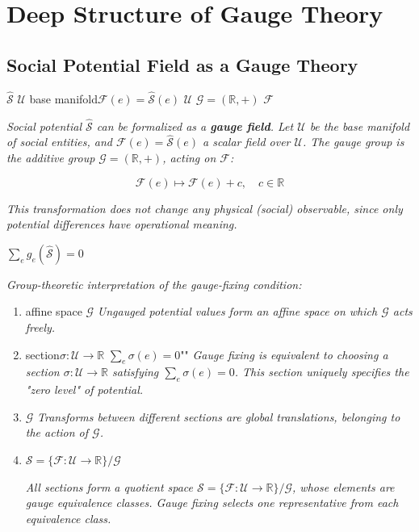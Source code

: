 \documentclass[11pt,a4paper]{article}
\theoremstyle{definition}
\newcommand{\Sop}{\hat{\mathcal{S}}}
\newcommand{\R}{\mathbb{R}}
\newcommand{\universe}{\mathcal{U}}
\newcommand{\socialfield}{\mathcal{F}}
\newcommand{\gaugegroup}{\mathcal{G}}
\begin{document}
\section{ Deep Structure of Gauge Theory}

\subsection{ Social Potential Field as a Gauge Theory}

 $\Sop$ \textbf{} $\universe$ 
base manifold$\socialfield(e) = \Sop(e)$  $\universe$ 
 $\gaugegroup = (\R, +)$ $\socialfield$ 

\medskip
\noindent\textit{Social potential $\Sop$ can be formalized as a \textbf{gauge field}. Let $\universe$ be the base manifold of social entities, and $\socialfield(e) = \Sop(e)$ a scalar field over $\universe$. The gauge group is the additive group $\gaugegroup = (\R, +)$, acting on $\socialfield$:}

\begin{equation}
    \socialfield(e) \mapsto \socialfield(e) + c, \quad c \in \R
    \label{eq:gauge-action}
\end{equation}

\noindent \textit{}
\textit{This transformation does not change any physical (social) observable, since only potential \textit{differences} have operational meaning.}

\bigskip
 $\sum_e g_e(\Sop) = 0$ 

\medskip
\noindent\textit{Group-theoretic interpretation of the gauge-fixing condition:}

\begin{enumerate}[leftmargin=*]
    \item affine space
     $\gaugegroup$ 
    \textit{Ungauged potential values form an affine space on which $\gaugegroup$ acts freely.}
    
    \item section$\sigma: \universe \to \R$
     $\sum_e \sigma(e) = 0$""
    \textit{Gauge fixing is equivalent to choosing a section $\sigma: \universe \to \R$ satisfying $\sum_e \sigma(e) = 0$. This section uniquely specifies the "zero level" of potential.}
    
    \item  $\gaugegroup$ 
    \textit{Transforms between different sections are global translations, belonging to the action of $\gaugegroup$.}
    
    \item  $\mathcal{S} = \{\socialfield: \universe \to \R\} / \gaugegroup$
    
    \textit{All sections form a quotient space $\mathcal{S} = \{\socialfield: \universe \to \R\} / \gaugegroup$, whose elements are gauge equivalence classes. Gauge fixing selects one representative from each equivalence class.}
\end{enumerate}
\end{document}
